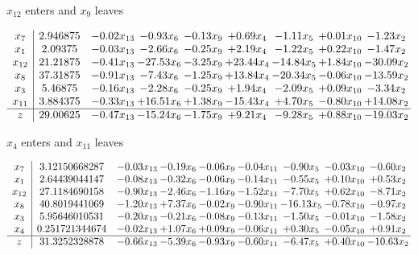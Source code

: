 \documentclass[9pt]{article}
\begin{document}
 $ x_{12} $ enters and $ x_{9} $ leaves 

 \[\begin{array}{c| c c@{\hskip 2pt} c@{\hskip 2pt} c@{\hskip 2pt} c@{\hskip 2pt} c@{\hskip 2pt} c@{\hskip 2pt} c@{\hskip 2pt} }
 x_{7}   &  2.946875 & -0.02 x_{13} & -0.93 x_{6} & -0.13 x_{9} & +  0.69 x_{4} & -1.11 x_{5} & +  0.01 x_{10} & -1.23 x_{2}\\
 x_{1}   &  2.09375 & -0.03 x_{13} & -2.66 x_{6} & -0.25 x_{9} & +  2.19 x_{4} & -1.22 x_{5} & +  0.22 x_{10} & -1.47 x_{2}\\
 x_{12}   &  21.21875 & -0.41 x_{13} & -27.53 x_{6} & -3.25 x_{9} & + 23.44 x_{4} & -14.84 x_{5} & +  1.84 x_{10} & -30.09 x_{2}\\
 x_{8}   &  37.31875 & -0.91 x_{13} & -7.43 x_{6} & -1.25 x_{9} & + 13.84 x_{4} & -20.34 x_{5} & -0.06 x_{10} & -13.59 x_{2}\\
 x_{3}   &  5.46875 & -0.16 x_{13} & -2.28 x_{6} & -0.25 x_{9} & +  1.94 x_{4} & -2.09 x_{5} & +  0.09 x_{10} & -3.34 x_{2}\\
 x_{11}   &  3.884375 & -0.33 x_{13} & + 16.51 x_{6} & +  1.38 x_{9} & -15.43 x_{4} & +  4.70 x_{5} & -0.80 x_{10} & + 14.08 x_{2}\\
\hline
z    &  29.00625 & -0.47 x_{13} & -15.24 x_{6} & -1.75 x_{9} & +  9.21 x_{4} & -9.28 x_{5} & +  0.88 x_{10} & -19.03 x_{2}\\
\end{array}\]


 $ x_{4} $ enters and $ x_{11} $ leaves 

 \[\begin{array}{c| c c@{\hskip 2pt} c@{\hskip 2pt} c@{\hskip 2pt} c@{\hskip 2pt} c@{\hskip 2pt} c@{\hskip 2pt} c@{\hskip 2pt} }
 x_{7}   &  3.12150668287 & -0.03 x_{13} & -0.19 x_{6} & -0.06 x_{9} & -0.04 x_{11} & -0.90 x_{5} & -0.03 x_{10} & -0.60 x_{2}\\
 x_{1}   &  2.64439044147 & -0.08 x_{13} & -0.32 x_{6} & -0.06 x_{9} & -0.14 x_{11} & -0.55 x_{5} & +  0.10 x_{10} & +  0.53 x_{2}\\
 x_{12}   &  27.1184690158 & -0.90 x_{13} & -2.46 x_{6} & -1.16 x_{9} & -1.52 x_{11} & -7.70 x_{5} & +  0.62 x_{10} & -8.71 x_{2}\\
 x_{8}   &  40.8019441069 & -1.20 x_{13} & +  7.37 x_{6} & -0.02 x_{9} & -0.90 x_{11} & -16.13 x_{5} & -0.78 x_{10} & -0.97 x_{2}\\
 x_{3}   &  5.95646010531 & -0.20 x_{13} & -0.21 x_{6} & -0.08 x_{9} & -0.13 x_{11} & -1.50 x_{5} & -0.01 x_{10} & -1.58 x_{2}\\
 x_{4}   &  0.251721344674 & -0.02 x_{13} & +  1.07 x_{6} & +  0.09 x_{9} & -0.06 x_{11} & +  0.30 x_{5} & -0.05 x_{10} & +  0.91 x_{2}\\
\hline
z    &  31.3252328878 & -0.66 x_{13} & -5.39 x_{6} & -0.93 x_{9} & -0.60 x_{11} & -6.47 x_{5} & +  0.40 x_{10} & -10.63 x_{2}\\
\end{array}\]
\end{document}
